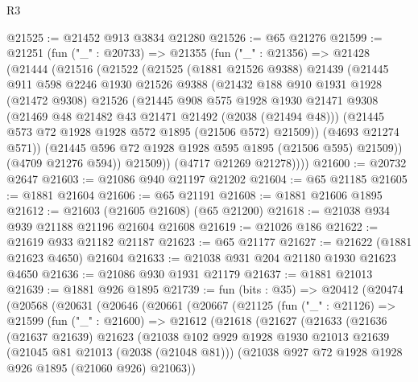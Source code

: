 \begin{lexlean}{R3}
\begin{coremodule}
@21525 := @21452 @913 @3834 @21280
@21526 := @65 @21276
@21599 := @21251
    (fun ("_" : @20733) =>
    @21355
      (fun ("_" : @21356) =>
      @21428
        (@21444
          (@21516
            (@21522
              (@21525
                (@1881 @21526 @9388)
                @21439
                (@21445
                  @911
                  @598
                  @2246
                  @1930
                  @21526
                  @9388
                  (@21432
                    @188
                    @910
                    @1931
                    @1928
                    (@21472 @9308)
                    @21526
                    (@21445
                      @908
                      @575
                      @1928
                      @1930
                      @21471
                      @9308
                      (@21469 @48 @21482 @43 @21471 @21492 (@2038 (@21494 @48)))
                      (@21445 @573 @72 @1928 @1928 @572 @1895 (@21506 @572) @21509))
                    (@4693 @21274 @571))
                  (@21445 @596 @72 @1928 @1928 @595 @1895 (@21506 @595) @21509))
                (@4709 @21276 @594))
              @21509))
          (@4717 @21269 @21278))))
@21600 := @20732 @2647
@21603 := @21086 @940 @21197 @21202
@21604 := @65 @21185
@21605 := @1881 @21604
@21606 := @65 @21191
@21608 := @1881 @21606 @1895
@21612 := @21603 (@21605 @21608) (@65 @21200)
@21618 := @21038 @934 @939 @21188 @21196 @21604 @21608
@21619 := @21026 @186
@21622 := @21619 @933 @21182 @21187
@21623 := @65 @21177
@21627 := @21622 (@1881 @21623 @4650) @21604
@21633 := @21038 @931 @204 @21180 @1930 @21623 @4650
@21636 := @21086 @930 @1931 @21179
@21637 := @1881 @21013
@21639 := @1881 @926 @1895
@21739 := fun (bits : @35) =>
  @20412
    (@20474
      (@20568
        (@20631
          (@20646
            (@20661
              (@20667
                (@21125
                  (fun ("_" : @21126) =>
                  @21599
                    (fun ("_" : @21600) =>
                    @21612
                      (@21618
                        (@21627
                          (@21633
                            (@21636
                              (@21637 @21639)
                              @21623
                              (@21038
                                @102
                                @929
                                @1928
                                @1930
                                @21013
                                @21639
                                (@21045 @81 @21013 (@2038 (@21048 @81)))
                                (@21038 @927 @72 @1928 @1928 @926 @1895 (@21060 @926) @21063))

\end{coremodule}
\end{lexlean}
